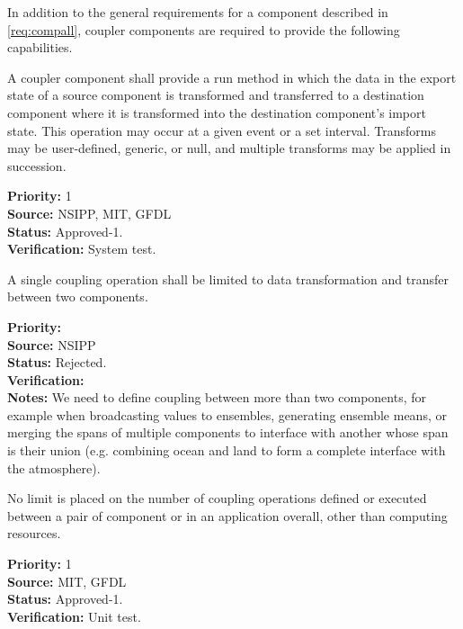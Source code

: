 
In addition to the general requirements for a component described in 
\ref{req:compall}, coupler components are required to provide the
following capabilities.

A coupler component shall provide a run method in which the data in the
export state of a source component is transformed and 
transferred to a destination component where it is transformed 
into the destination component's import state.  This operation 
may occur at a given event or a set interval.  Transforms may be 
user-defined, generic, or null, and multiple transforms may be applied 
in succession.
\begin{reqlist}
{\bf Priority:} 1\\ 
{\bf Source:} NSIPP, MIT, GFDL \\
{\bf Status:} Approved-1.\\
{\bf Verification:} System test.
\end{reqlist}

A single coupling operation shall be limited to data transformation and
transfer between two components.
\begin{reqlist}
{\bf Priority:} \\ 
{\bf Source:} NSIPP \\
{\bf Status:} Rejected.\\
{\bf Verification:} \\
{\bf Notes:} We need to define coupling between more than two 
components, for example when broadcasting values to ensembles,
generating ensemble means, or merging the spans of multiple components
to interface with another whose span is their union (e.g. 
combining ocean and land to form a complete interface with the 
atmosphere).
\end{reqlist}

No limit is placed on the number of coupling operations defined or
executed between a pair of component or in an application overall, 
other than computing resources.
\begin{reqlist}
{\bf Priority:} 1\\ 
{\bf Source:} MIT, GFDL \\
{\bf Status:} Approved-1.\\
{\bf Verification:} Unit test.\\
\end{reqlist}

